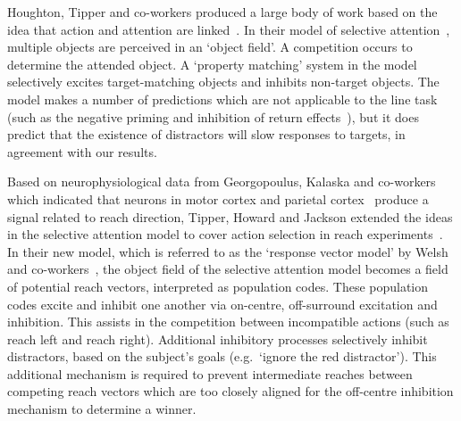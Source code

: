 \documentclass[10pt,letterpaper]{article}
\begin{document}
Houghton, Tipper and co-workers produced a large body of work based on
the idea that action and attention are
linked~\cite{tipper_selective_1992,
  houghton_model_1994,houghton_inhibition_1996,tipper_selective_1997,
  tipper_actionbased_1998,tipper_reaching_2001}. In their model of
selective
attention~\cite{houghton_model_1994,houghton_inhibition_1996},
multiple objects are perceived in an `object field'. A competition
occurs to determine the attended object. A `property matching' system
in the model selectively excites target-matching objects and inhibits
non-target objects. The model makes a number of predictions which are
not applicable to the line task (such as the negative priming and
inhibition of return effects~\cite{houghton_model_1994}), but it does
predict that the existence of distractors will slow responses to
targets, in agreement with our results.

Based on neurophysiological data from Georgopoulus, Kalaska and
co-workers which indicated that neurons in motor
cortex\cite{georgopoulos_neuronal_1986} and parietal
cortex~\cite{kalaska_cortical_1983} produce a signal related to reach
direction, Tipper, Howard and Jackson extended the ideas in the
selective attention model to cover action selection in reach
experiments~\cite{tipper_selective_1997}. In their new model, which is
referred to as the `response vector model' by Welsh and
co-workers~\cite{welsh_movement_2004}, the object field of the
selective attention model becomes a field of potential reach vectors,
interpreted as population codes.  These population codes excite and
inhibit one another via on-centre, off-surround excitation and
inhibition. This assists in the competition between incompatible
actions (such as reach left and reach right). Additional inhibitory
processes selectively inhibit distractors, based on the subject's
goals (e.g.~`ignore the red distractor'). This additional mechanism is
required to prevent intermediate reaches between competing reach
vectors which are too closely aligned for the off-centre inhibition
mechanism to determine a winner.
\end{document}

